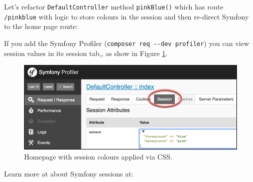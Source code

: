 \documentclass[a4paperpaper,openright]{book}
\newenvironment{Shaded}{}{}
\newcommand{\AnnotationTok}[1]{\textcolor[rgb]{0.38,0.63,0.69}{\textbf{\textit{#1}}}}
\newcommand{\CommentTok}[1]{\textcolor[rgb]{0.38,0.63,0.69}{\textit{#1}}}
\newcommand{\KeywordTok}[1]{\textcolor[rgb]{0.00,0.44,0.13}{\textbf{#1}}}
\newcommand{\NormalTok}[1]{#1}
\newcommand{\OtherTok}[1]{\textcolor[rgb]{0.00,0.44,0.13}{#1}}
\newcommand{\StringTok}[1]{\textcolor[rgb]{0.25,0.44,0.63}{#1}}
\begin{document}
Let's refactor \texttt{DefaultController} method \texttt{pinkBlue()}
which has route \texttt{/pinkblue} with logic to store colours in the
session and then re-direct Symfony to the home page route:

\begin{Shaded}
\end{Shaded}

If you add the Symfony Profiler
(\texttt{composer\ req\ -\/-dev\ profiler}) you can view session values
in its session tab,, as show in Figure \ref{session_profiler}.

\begin{figure}
\centering
\includegraphics{./tex2pdf.-8aed53dcd332a606/b55c386213380dcd9a550b90e2383b0bc3e55ffa.png}
\caption{Homepage with session colours applied via CSS.
\label{session_profiler}}
\end{figure}

Learn more at about Symfony sessions at:
\end{document}
